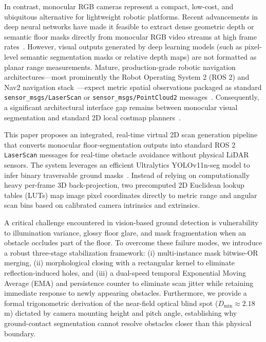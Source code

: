 \documentclass{ieeeaccess}
\begin{document}
In contrast, monocular RGB cameras represent a compact, low-cost, and ubiquitous alternative for lightweight robotic platforms. Recent advancements in deep neural networks have made it feasible to extract dense geometric depth or semantic floor masks directly from monocular RGB video streams at high frame rates~\cite{shariqfarooqbhat_2021_adabins,ranftl_2021_vision,ultralytics_2024_ultralytics}. However, visual outputs generated by deep learning models (such as pixel-level semantic segmentation masks or relative depth maps) are not formatted as planar range measurements. Mature, production-grade robotic navigation architectures---most prominently the Robot Operating System 2 (ROS 2) and Nav2 navigation stack~\cite{macenski_2022_robot,macenski_2023_from}---expect metric spatial observations packaged as standard \texttt{sensor\_msgs/LaserScan} or \texttt{sensor\_msgs/PointCloud2} messages~\cite{openrobotics_sensor_msgslaserscan}. Consequently, a significant architectural interface gap remains between monocular visual segmentation and standard 2D local costmap planners~\cite{openrobotics_2020_depthimage_to_laserscan,opennavigationllc_2023_costmap}.

This paper proposes an integrated, real-time virtual 2D scan generation pipeline that converts monocular floor-segmentation outputs into standard ROS 2 \texttt{LaserScan} messages for real-time obstacle avoidance without physical LiDAR sensors. The system leverages an efficient Ultralytics YOLOv11n-seg model to infer binary traversable ground masks~\cite{ultralytics_2024_ultralytics}. Instead of relying on computationally heavy per-frame 3D back-projection, two precomputed 2D Euclidean lookup tables (LUTs) map image pixel coordinates directly to metric range and angular scan bins based on calibrated camera intrinsics and extrinsics.

A critical challenge encountered in vision-based ground detection is vulnerability to illumination variance, glossy floor glare, and mask fragmentation when an obstacle occludes part of the floor. To overcome these failure modes, we introduce a robust three-stage stabilization framework: (i) multi-instance mask bitwise-OR merging, (ii) morphological closing with a rectangular kernel to eliminate reflection-induced holes, and (iii) a dual-speed temporal Exponential Moving Average (EMA) and persistence counter to eliminate scan jitter while retaining immediate response to newly appearing obstacles. Furthermore, we provide a formal trigonometric derivation of the near-field optical blind spot ($D_{\min} \approx 2.18$\,m) dictated by camera mounting height and pitch angle, establishing why ground-contact segmentation cannot resolve obstacles closer than this physical boundary.
\end{document}
